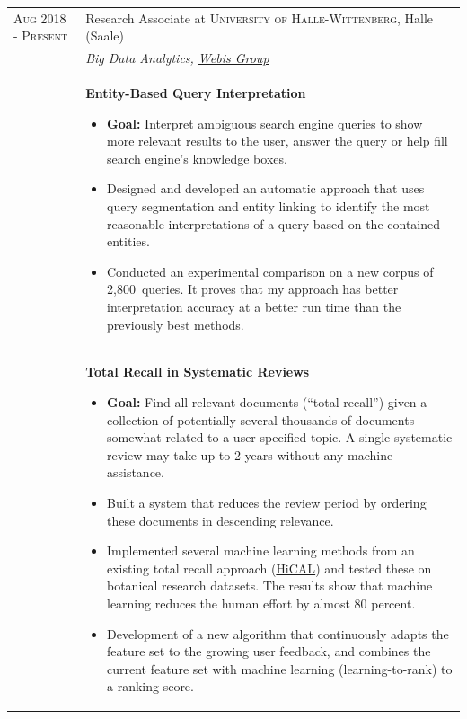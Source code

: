 \documentclass[a4paper,10pt]{article} %
\begin{document}
\begin{longtable}{l p{11cm}}
\textsc{Aug 2018 - Present} & Research Associate at \textsc{University of Halle-Wittenberg}, Halle (Saale)
\\
& \emph{Big Data Analytics, \href{https://webis.de}{Webis Group}}\\[1mm]
& \textbf{\footnotesize{Entity-Based Query Interpretation}}\vspace{0.2em}
  {\footnotesize
  	\begin{itemize}
  		\setlength\itemsep{0.2em}
 		\item \textbf{Goal:} Interpret ambiguous search engine queries to show more relevant results to the user, answer the query or help fill search engine's knowledge boxes. 
 		\item Designed and developed an automatic approach that uses query segmentation and entity linking to identify the most reasonable interpretations of a query based on the contained entities. 
		\item Conducted an experimental comparison on a new corpus of 2,800~queries. It proves that my approach has better interpretation accuracy at a better run time than the previously best methods.    
  \end{itemize}
  }
\\[-2mm]
& \textbf{\footnotesize{Total Recall in Systematic Reviews}}\vspace{0.2em}
  {\footnotesize
  	\begin{itemize}
  		\setlength\itemsep{0.2em}
 		\item \textbf{Goal:} Find all relevant documents (“total recall”) given a collection of potentially several thousands of documents somewhat related to a user-specified topic. A single systematic review may take up to 2 years without any machine-assistance. 
 		\item Built a system that reduces the review period by ordering these documents in descending relevance. 
 		\item Implemented several machine learning methods from an existing total recall approach (\href{https://github.com/hical/HiCAL}{HiCAL}) and tested these on botanical research datasets. The results show that machine learning reduces the human effort by almost 80 percent. 
		\item Development of a new algorithm that continuously adapts the feature set to the growing user feedback, and combines the current feature set with machine learning (learning-to-rank) to a ranking score.    
  \end{itemize}
}
\end{longtable}
\end{document}
